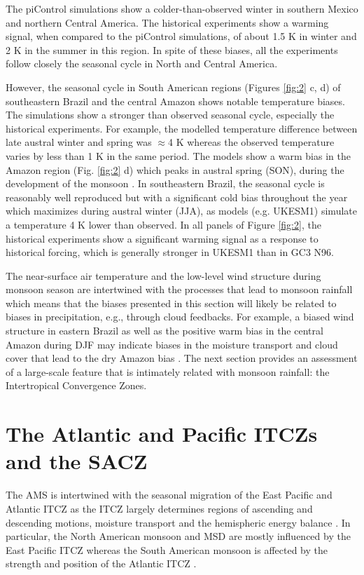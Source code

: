 The piControl simulations show a colder-than-observed winter in southern Mexico and northern Central America. The historical experiments show a warming signal, when compared to the piControl simulations, of about 1.5 K in winter and 2 K in the summer in this region. In spite of these biases, all the experiments follow closely the seasonal cycle in North and Central America.

However, the seasonal cycle in South American regions (Figures \ref{fig:2} c, d) of southeastern Brazil and the central Amazon shows notable temperature biases.
The simulations show a stronger than observed seasonal cycle, especially the historical experiments. For example, the modelled temperature difference between late austral winter and spring was $\approx$4 K whereas the observed temperature varies by less than 1 K in the same period. The models show a warm bias in the Amazon region (Fig. \ref{fig:2} d) which peaks in austral spring (SON), during the development of the monsoon \citep{marengo2012}.
In southeastern Brazil, the seasonal cycle is reasonably well reproduced but with a significant cold bias throughout the year which maximizes during austral winter (JJA), as models (e.g. UKESM1) simulate  a temperature 4 K lower than observed.
In all panels of Figure \ref{fig:2}, the historical experiments show a significant warming signal as a response to historical forcing, which is generally stronger in UKESM1 than in GC3 N96. 


The near-surface air temperature and the low-level wind structure during monsoon season are intertwined with the processes that lead to monsoon rainfall which means that the biases presented in this section will likely be related to biases in precipitation, e.g., through cloud feedbacks. For example, a biased wind structure in eastern Brazil as well as the positive warm bias in the central Amazon during DJF may indicate biases in the moisture transport and cloud cover that lead to the dry Amazon bias \citep{jones2013}. The next section provides an assessment of a large-scale feature that is intimately related with monsoon rainfall:  the Intertropical Convergence Zones.

\section{The Atlantic and Pacific ITCZs and the SACZ}\label{sq:itcz}



The AMS is intertwined with the seasonal migration of the East Pacific and Atlantic ITCZ as the ITCZ largely determines regions of ascending and descending motions, moisture transport and the hemispheric energy balance \citep{oueslati2013,li2014,zhou2016,cai2019pantropical}. In particular, the North American monsoon and MSD are mostly influenced by the East Pacific ITCZ whereas the South American monsoon is affected by the strength and position of the Atlantic ITCZ \citep{yoon2010atlantic,marengo2012}. 


